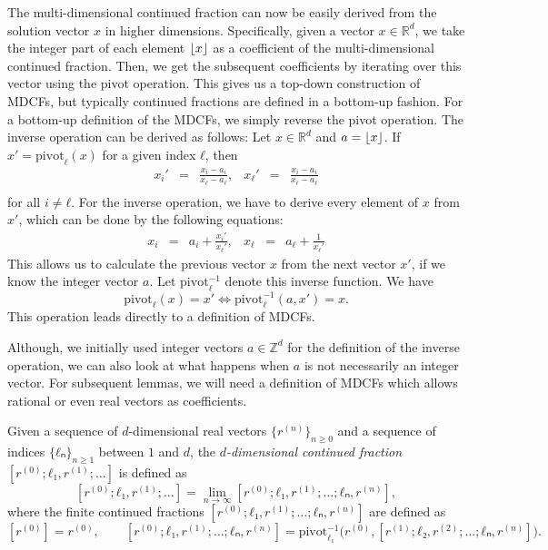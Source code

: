 The multi-dimensional continued fraction can now be easily derived from the
solution vector $x$ in higher dimensions.
Specifically, given a vector $x ∈ ℝ^d$, we take the integer part of each
element $\lfloor x\rfloor$ as a coefficient of the multi-dimensional continued
fraction.
Then, we get the subsequent coefficients by iterating over this vector using
the pivot operation.
This gives us a top-down construction of MDCFs, but typically continued
fractions are defined in a bottom-up fashion.
For a bottom-up definition of the MDCFs, we simply reverse the pivot operation.
The inverse operation can be derived as follows:
Let $x ∈ ℝ^d$ and $a = \lfloor x\rfloor$.
If $x' = \mathrm{pivot}_ℓ(x)$ for a given index $ℓ$, then
\[
  \begin{array}{lcrlcr}
    \displaystyle x_i' & = & \displaystyle \frac{x_i - a_i}{x_ℓ - a_ℓ}, &
    \displaystyle x_ℓ' & = & \displaystyle \frac{x_i - a_i}{x_ℓ - a_ℓ} \\[1em]
  \end{array}
\]
for all $i ≠ ℓ$.
For the inverse operation, we have to derive every element of $x$ from $x'$,
which can be done by the following equations:
\[
  \begin{array}{lcrlcr}
    \displaystyle x_i & = & a_i + \displaystyle \frac{x_i'}{x_ℓ'}, &
    \displaystyle x_ℓ & = & a_ℓ + \displaystyle \frac{1}{x_ℓ'}
  \end{array}
\]
This allows us to calculate the previous vector $x$ from the next vector $x'$,
if we know the integer vector $a$.
Let $\mathrm{pivot}_ℓ^{-1}$ denote this inverse function.
We have
\[
  \mathrm{pivot}_ℓ(x) = x' \iff \mathrm{pivot}_ℓ^{-1}(a, x') = x.
\]
This operation leads directly to a definition of MDCFs.

Although, we initially used integer vectors $a ∈ ℤ^d$ for the definition of the inverse operation,
we can also look at what happens when $a$ is not necessarily an integer vector.
For subsequent lemmas, we will need a definition of MDCFs which allows rational
or even real vectors as coefficients.

\begin{definition}
  Given a sequence of $d$-dimensional real vectors $\{r^{(n)}\}_{n ≥ 0}$ and a sequence of
  indices $\{ℓₙ\}_{n ≥ 1}$ between $1$ and $d$,
  the \emph{$d$-dimensional continued fraction} $[r^{(0)}; ℓ₁, r^{(1)}; …]$ is defined as
  \[
    [r^{(0)}; ℓ₁, r^{(1)}; …] = \lim_{n → ∞} [r^{(0)}; ℓ₁, r^{(1)}; …; ℓₙ, r^{(n)}],
  \]
  where the finite continued fractions $[r^{(0)}; ℓ₁, r^{(1)}; …; ℓₙ, r^{(n)}]$ are defined as
  \[
    [r^{(0)}] = r^{(0)},
    \qquad
    [r^{(0)}; ℓ₁, r^{(1)}; …; ℓₙ, r^{(n)}]
    = \mathrm{pivot}_{ℓ₁}^{-1}\big(r^{(0)}, [r^{(1)}; ℓ₂, r^{(2)}; …; ℓₙ, r^{(n)}]\big).
  \]
\end{definition}

